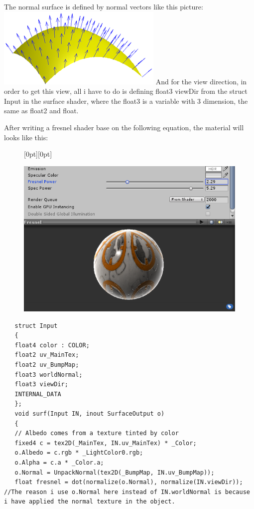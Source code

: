 \documentclass[a4paper, 13pt]{extarticle}
\begin{document}
{   The normal surface is defined by normal vectors like this picture: \includegraphics[width=0.3\linewidth]{Surface_normal.png}
   And for the view direction, in order to get this view, all i have to do is defining float3 viewDir from the struct Input in the surface shader, where the float3 is a variable with 3 dimension, the same as float2 and float. 
   
   After writing a fresnel shader base on the following equation, the material will looks like this:
    \begin{figure}[h]
    	\raisebox{-21mm}[0pt][0pt]{
    	\begin{minipage}{.4\textwidth}
    		\centering
    		\includegraphics[width=1\linewidth]{intructions/fresnel_effect.png}
    		\centering
    	\end{minipage}
    }
    \end{figure}
\newpage
   \begin{lstlisting}
   struct Input
   {
   float4 color : COLOR;
   float2 uv_MainTex;
   float2 uv_BumpMap;
   float3 worldNormal;
   float3 viewDir;
   INTERNAL_DATA
   };   
   void surf(Input IN, inout SurfaceOutput o)
   {
   // Albedo comes from a texture tinted by color
   fixed4 c = tex2D(_MainTex, IN.uv_MainTex) * _Color;
   o.Albedo = c.rgb * _LightColor0.rgb;
   o.Alpha = c.a * _Color.a;
   o.Normal = UnpackNormal(tex2D(_BumpMap, IN.uv_BumpMap));
   float fresnel = dot(normalize(o.Normal), normalize(IN.viewDir)); //The reason i use o.Normal here instead of IN.worldNormal is because i have applied the normal texture in the object.

\end{lstlisting}}
\end{document}

